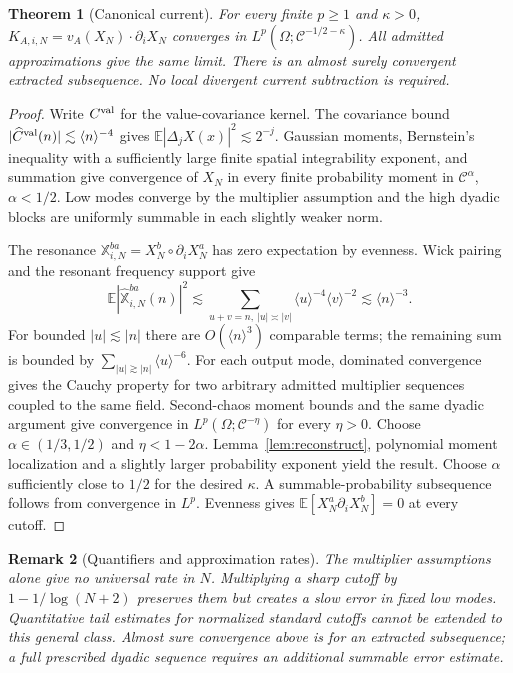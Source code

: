 \documentclass[11pt]{article}
\newtheorem{theorem}{Theorem}[section]
\newtheorem{remark}[theorem]{Remark}
\newcommand{\E}{\mathbb E}
\newcommand{\la}[1]{\langle #1\rangle}
\begin{document}
\begin{theorem}[Canonical current]\label{thm:current}
For every finite $p\ge1$ and $\kappa>0$,
$K_{A,i,N}=v_A(X_N)\cdot\partial_iX_N$ converges in
$L^p(\Omega;\mathcal C^{-1/2-\kappa})$. All admitted approximations
give the same limit. There is an almost surely convergent extracted
subsequence. No local divergent current subtraction is required.
\end{theorem}
\begin{proof}
Write $C^{\rm val}$ for the value-covariance kernel.
The covariance bound $|\widehat C^{\rm val}(n)|\lesssim\la n^{-4}$ gives
$\E|\Delta_j X(x)|^2\lesssim2^{-j}$.
Gaussian moments, Bernstein's inequality with a sufficiently large finite
spatial integrability exponent, and summation give convergence of $X_N$
in every finite probability moment in $\mathcal C^\alpha$, $\alpha<1/2$.
Low modes converge by the multiplier assumption and the high dyadic blocks
are uniformly summable in each slightly weaker norm.

The resonance $\mathbb X_{i,N}^{ba}=X_N^b\circ\partial_iX_N^a$ has zero
expectation by evenness. Wick pairing and the resonant frequency support give
\begin{equation}\label{eq:resvariance}
 \E|\widehat{\mathbb X}_{i,N}^{ba}(n)|^2
 \lesssim\sum_{u+v=n,\ |u|\asymp|v|}
       \la u^{-4}\la v^{-2}\lesssim\la n^{-3}.
\end{equation}
For bounded $|u|\lesssim|n|$ there are $O(\la n^3)$ comparable terms;
the remaining sum is bounded by $\sum_{|u|\gtrsim|n|}\la u^{-6}$.
For each output mode, dominated convergence gives the Cauchy property
for two arbitrary admitted multiplier sequences coupled to the same field.
Second-chaos moment bounds and the same dyadic argument give convergence
in $L^p(\Omega;\mathcal C^{-\eta})$ for every $\eta>0$.
Choose $\alpha\in(1/3,1/2)$ and $\eta<1-2\alpha$.
Lemma~\ref{lem:reconstruct}, polynomial moment localization and a slightly
larger probability exponent yield the result. Choose $\alpha$ sufficiently
close to $1/2$ for the desired $\kappa$. A summable-probability subsequence
follows from convergence in $L^p$. Evenness gives
$\E[X_N^a\partial_iX_N^b]=0$ at every cutoff.
\end{proof}

\begin{remark}[Quantifiers and approximation rates]
The multiplier assumptions alone give no universal rate in $N$.
Multiplying a sharp cutoff by $1-1/\log(N+2)$ preserves them but creates
a slow error in fixed low modes. Quantitative tail estimates for normalized
standard cutoffs cannot be extended to this general class. Almost sure
convergence above is for an extracted subsequence; a full prescribed dyadic
sequence requires an additional summable error estimate.
\end{remark}
\end{document}
